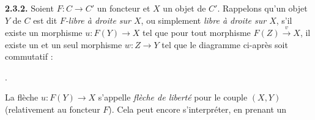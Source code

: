 \medskip
\noindent\textbf{2.3.2.}\quad
{}
Soient $F\colon C\longrightarrow C'$ un foncteur et $X$ un objet de $C'$.
Rappelons qu'un objet $Y$ de $C$ est dit \emph{$F$-libre à droite sur
$X$}, ou simplement \emph{libre à droite sur $X$}, s'il existe un
morphisme $u\colon F(Y)\longrightarrow X$ tel que pour tout morphisme
$F(Z)\xrightarrow{v}X$, il existe un et un seul morphisme
$w\colon Z\longrightarrow Y$ tel que le diagramme ci-après soit
commutatif :

\begin{center}
  \quad .
\end{center}

La flèche $u\colon F(Y)\longrightarrow X$ s'appelle \emph{flèche de
liberté} pour le couple $(X,Y)$ (relativement au foncteur $F$). Cela peut
encore s'interpréter, en prenant un
\endgroup
